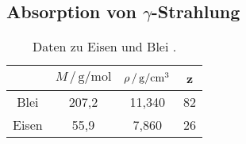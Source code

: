 \subsection{\texorpdfstring{Absorption von $\gamma$}{(Absorption von gamma)}-Strahlung}
\begin{wraptable}{r}{5cm}
  \centering
  \caption{Daten zu Eisen \cite{Mfe} und Blei \cite{Mpb}\cite{dichte}.}
  \begin{tabular}{cccc}
    \toprule
    & $M\,/\,\si{\gram\per\mol}$ & $\rho\,/\,\si{\gram\per\cubic\centi\meter}$ & z \\
    \midrule
    Blei  & 207,2  & 11,340  & 82 \\
    Eisen &  55,9  &  7,860  & 26 \\
  \end{tabular}
  \label{tab:werte}
\end{wraptable}

